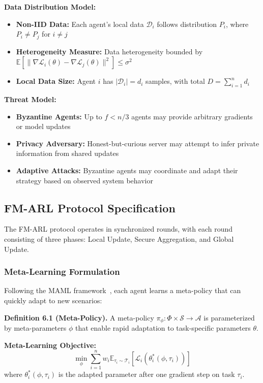 \documentclass[conference]{IEEEtran}
\begin{document}
\textbf{Data Distribution Model:}
\begin{itemize}
    \item \textbf{Non-IID Data:} Each agent's local data $\mathcal{D}_i$ follows distribution $P_i$, where $P_i \neq P_j$ for $i \neq j$
    \item \textbf{Heterogeneity Measure:} Data heterogeneity bounded by $\mathbb{E}[\|\nabla \mathcal{L}_i(\theta) - \nabla \mathcal{L}_j(\theta)\|^2] \leq \sigma^2$
    \item \textbf{Local Data Size:} Agent $i$ has $|\mathcal{D}_i| = d_i$ samples, with total $D = \sum_{i=1}^n d_i$
\end{itemize}

\textbf{Threat Model:}
\begin{itemize}
    \item \textbf{Byzantine Agents:} Up to $f < n/3$ agents may provide arbitrary gradients or model updates
    \item \textbf{Privacy Adversary:} Honest-but-curious server may attempt to infer private information from shared updates
    \item \textbf{Adaptive Attacks:} Byzantine agents may coordinate and adapt their strategy based on observed system behavior
\end{itemize}

\subsection{FM-ARL Protocol Specification}

The FM-ARL protocol operates in synchronized rounds, with each round consisting of three phases: Local Update, Secure Aggregation, and Global Update.

\subsubsection{Meta-Learning Formulation}

Following the MAML framework~\cite{finn2017model}, each agent learns a meta-policy that can quickly adapt to new scenarios:

\textbf{Definition 6.1 (Meta-Policy).} A meta-policy $\pi_\phi: \Phi \times \mathcal{S} \rightarrow \mathcal{A}$ is parameterized by meta-parameters $\phi$ that enable rapid adaptation to task-specific parameters $\theta$.

\textbf{Meta-Learning Objective:}
\begin{equation}
\min_\phi \sum_{i=1}^n w_i \mathbb{E}_{\tau_i \sim \mathcal{T}_i} \left[ \mathcal{L}_i(\theta_i^*(\phi, \tau_i)) \right]
\end{equation}
where $\theta_i^*(\phi, \tau_i)$ is the adapted parameter after one gradient step on task $\tau_i$.
\end{document}
